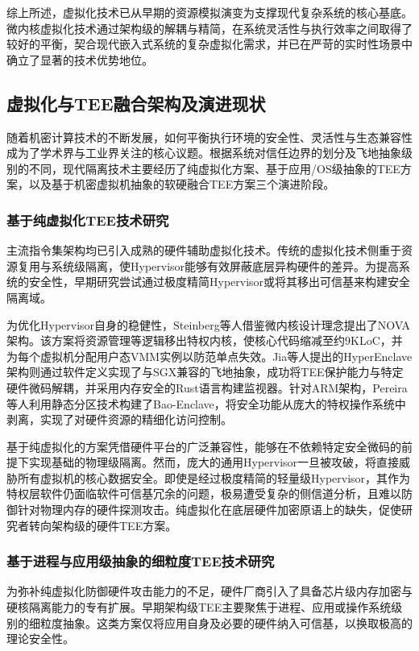 \documentclass[master, vlined, review]{DissertUESTC}
\begin{document}
	综上所述，虚拟化技术已从早期的资源模拟演变为支撑现代复杂系统的核心基底。微内核虚拟化技术通过架构级的解耦与精简，在系统灵活性与执行效率之间取得了较好的平衡，契合现代嵌入式系统的复杂虚拟化需求，并已在严苛的实时性场景中确立了显著的技术优势地位。
	
	\subsection{虚拟化与TEE融合架构及演进现状}
	随着机密计算技术的不断发展，如何平衡执行环境的安全性、灵活性与生态兼容性成为了学术界与工业界关注的核心议题。根据系统对信任边界的划分及飞地抽象级别的不同，现代隔离技术主要经历了纯虚拟化方案、基于应用/OS级抽象的TEE方案，以及基于机密虚拟机抽象的软硬融合TEE方案三个演进阶段。
	
	\subsubsection{基于纯虚拟化TEE技术研究}
	主流指令集架构均已引入成熟的硬件辅助虚拟化技术。传统的虚拟化技术侧重于资源复用与系统级隔离，使Hypervisor能够有效屏蔽底层异构硬件的差异。为提高系统的安全性，早期研究尝试通过极度精简Hypervisor或将其移出可信基来构建安全隔离域。
	
	为优化Hypervisor自身的稳健性，Steinberg等人借鉴微内核设计理念提出了NOVA架构。该方案将资源管理等逻辑移出特权内核，使核心代码缩减至约9KLoC，并为每个虚拟机分配用户态VMM实例以防范单点失效。Jia等人提出的HyperEnclave架构则通过软件定义实现了与SGX兼容的飞地抽象，成功将TEE保护能力与特定硬件微码解耦，并采用内存安全的Rust语言构建监视器。针对ARM架构，Pereira等人利用静态分区技术构建了Bao-Enclave，将安全功能从庞大的特权操作系统中剥离，实现了对硬件资源的精细化访问控制。
	
	基于纯虚拟化的方案凭借硬件平台的广泛兼容性，能够在不依赖特定安全微码的前提下实现基础的物理级隔离。然而，庞大的通用Hypervisor一旦被攻破，将直接威胁所有虚拟机的核心数据安全。即使是经过极度精简的轻量级Hypervisor，其作为特权层软件仍面临软件可信基冗余的问题，极易遭受复杂的侧信道分析，且难以防御针对物理内存的硬件探测攻击。纯虚拟化在底层硬件加密原语上的缺失，促使研究者转向架构级的硬件TEE方案。
	
	\subsubsection{基于进程与应用级抽象的细粒度TEE技术研究}
	为弥补纯虚拟化防御硬件攻击能力的不足，硬件厂商引入了具备芯片级内存加密与硬核隔离能力的专有扩展。早期架构级TEE主要聚焦于进程、应用或操作系统级别的细粒度抽象。这类方案仅将应用自身及必要的硬件纳入可信基，以换取极高的理论安全性。
	
\end{document}
